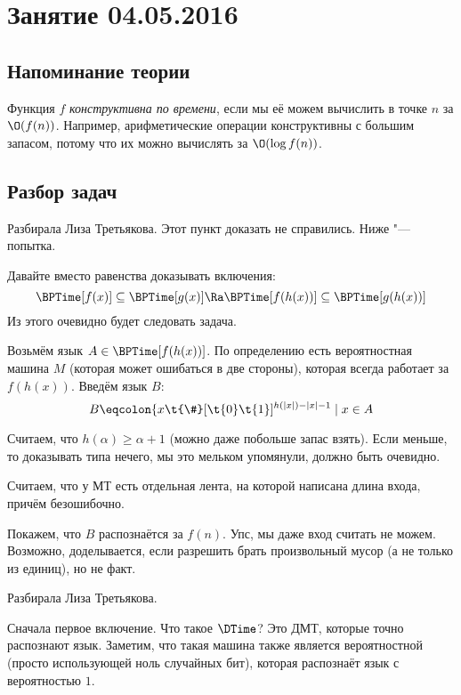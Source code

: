 \chapter{Занятие 04.05.2016}

\section{Напоминание теории}
	\begin{Def}
		Функция $f$ \textit{конструктивна по времени}, если мы её можем вычислить в точке $n$
		за $\O(f(n))$.
		Например, арифметические операции конструктивны с большим запасом, потому что
		их можно вычислять за $\O(\log f(n))$.
	\end{Def}

\section{Разбор задач}
	Разбирала Лиза Третьякова.
	Этот пункт доказать не справились.
	Ниже "--- попытка.

	Давайте вместо равенства доказывать включения:
	\[ \BPTime[f(x)] \subseteq \BPTime[g(x)]  \Ra \BPTime[f(h(x))] \subseteq \BPTime[g(h(x))] \]
	Из этого очевидно будет следовать задача.

	Возьмём язык $A \in \BPTime[f(h(x))]$.
	По определению есть вероятностная машина $M$ (которая может ошибаться в две стороны), которая
	всегда работает за $f(h(x))$.
	Введём язык $B$:
	\[ B \eqcolon \{ x\t{\#}[\t{0}\t{1}]^{h(|x|)-|x|-1} \mid x \in A \]
	\begin{Rem}
		Считаем, что $h(\alpha) \ge \alpha + 1$ (можно даже побольше запас взять).
		Если меньше, то доказывать типа нечего, мы это мельком упомянули, должно быть очевидно.
	\end{Rem}
	\begin{Rem}
		Считаем, что у МТ есть отдельная лента, на которой написана длина входа, причём безошибочно.
	\end{Rem}
	Покажем, что $B$ распознаётся за $f(n)$.
	Упс, мы даже вход считать не можем.
	Возможно, доделывается, если разрешить брать произвольный мусор (а не только из единиц), но не факт.

	Разбирала Лиза Третьякова.

	Сначала первое включение.
	Что такое $\DTime$?
	Это ДМТ, которые точно распознают язык.
	Заметим, что такая машина также является вероятностной (просто использующей ноль случайных бит), которая распознаёт язык с вероятностью $1$.

